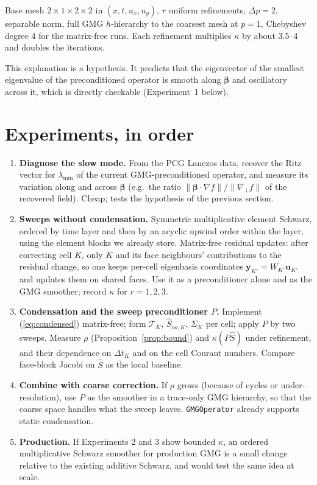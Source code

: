 \documentclass[11pt]{article}
\theoremstyle{remark}
\theoremstyle{definition}
\newcommand{\bbeta}{\boldsymbol{\beta}}
\newcommand{\Shat}{\widehat{S}}
\newcommand{\Tr}{\mathcal{T}}
\begin{document}
Base mesh $2\times1\times2\times2$ in $(x,t,u_x,u_y)$, $r$ uniform refinements, $\Delta p=2$, separable norm, full GMG
$h$-hierarchy to the coarsest mesh at $p=1$, Chebyshev degree 4 for the matrix-free runs.  Each refinement multiplies
$\kappa$ by about 3.5--4 and doubles the iterations.

This explanation is a hypothesis.  It predicts that the eigenvector of the smallest eigenvalue of the preconditioned
operator is smooth along $\bbeta$ and oscillatory across it, which is directly checkable (Experiment~1 below).

\section{Experiments, in order}

\begin{enumerate}
  \item \textbf{Diagnose the slow mode.}  From the PCG Lanczos data, recover the Ritz vector for $\lambda_{\min}$ of
        the current GMG-preconditioned operator, and measure its variation along and across $\bbeta$ (e.g.\ the
        ratio $\|\bbeta\cdot\nabla f\|/\|\nabla_\perp f\|$ of the recovered field).  Cheap; tests the hypothesis of
        the previous section.
  \item \textbf{Sweeps without condensation.}  Symmetric multiplicative element Schwarz, ordered by time layer and
        then by an acyclic upwind order within the layer, using the element blocks we already store.  Matrix-free
        residual updates: after correcting cell $K$, only $K$ and its face neighbours' contributions to the residual
        change, so one keeps per-cell eigenbasis coordinates $\mathbf y_{K'}=W_{K'}\mathbf u_{K'}$ and updates them on
        shared faces.  Use it as a preconditioner alone and as the GMG smoother; record $\kappa$ for $r=1,2,3$.
  \item \textbf{Condensation and the sweep preconditioner $P$.}  Implement (\ref{eq:condensed}) matrix-free; form
        $\Tr_K$, $\Shat_{oo,K}$, $\Sigma_K$ per cell; apply $P$ by two sweeps.  Measure $\rho$
        (Proposition~\ref{prop:bound}) and $\kappa(P\Shat)$ under refinement, and their dependence on $\Delta t_K$ and
        on the cell Courant numbers.  Compare face-block Jacobi on $\Shat$ as the local baseline.
  \item \textbf{Combine with coarse correction.}  If $\rho$ grows (because of cycles or under-resolution), use $P$ as
        the smoother in a trace-only GMG hierarchy, so that the coarse space handles what the sweep leaves.
        \texttt{GMGOperator} already supports static condensation.
  \item \textbf{Production.}  If Experiments 2 and 3 show bounded $\kappa$, an ordered multiplicative Schwarz
        smoother
        for production GMG is a small change relative to the existing additive Schwarz, and would test the same
        idea at scale.
\end{enumerate}
\end{document}

